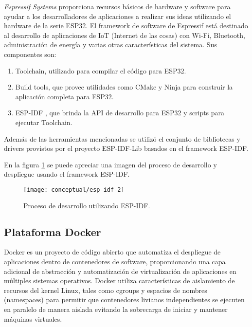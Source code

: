 \textit{Espressif Systems} proporciona recursos básicos de hardware y software para ayudar a los desarrolladores de aplicaciones a realizar sus ideas utilizando el hardware de la serie ESP32. El framework de software de Espressif está destinado al desarrollo de aplicaciones de IoT (Internet de las cosas) con Wi-Fi, Bluetooth, administración de energía y varias otras características del sistema.
Sus componentes son:
\begin{enumerate}
	\item Toolchain, utilizado para compilar el código para ESP32.
	\item Build tools, que provee utilidades como CMake \cite{cmake_website} y Ninja \cite{ninja_website} para construir la aplicación completa para ESP32.
	\item ESP-IDF \cite{ESPIDF_home}, que brinda la API de desarrollo para ESP32 y scripts para ejecutar Toolchain.
	
\end{enumerate}

Además de las herramientas mencionadas se utilizó el conjunto de bibliotecas y drivers provistos por el proyecto ESP-IDF-Lib \cite{esp_idf_lib_website} basados en el framework ESP-IDF.

En la figura \ref{fig:esp-idf} se puede apreciar una imagen del proceso de desarrollo y despliegue usando el framework ESP-IDF.

\begin{figure}[h]
    \centering
    \texttt{[image: conceptual/esp-idf-2]}
    \caption{Proceso de desarrollo utilizando ESP-IDF\protect\footnotemark.}
    \label{fig:esp-idf}
\end{figure}


\subsection{Plataforma Docker}

Docker \cite{docker_website} es un proyecto de código abierto que automatiza el despliegue de aplicaciones dentro de contenedores de software, proporcionando una capa adicional de abstracción y automatización de virtualización de aplicaciones en múltiples sistemas operativos. Docker utiliza características de aislamiento de recursos del kernel Linux, tales como cgroups y espacios de nombres (namespaces) para permitir que contenedores livianos independientes se ejecuten en paralelo de manera aislada evitando la sobrecarga de iniciar y mantener máquinas virtuales.

